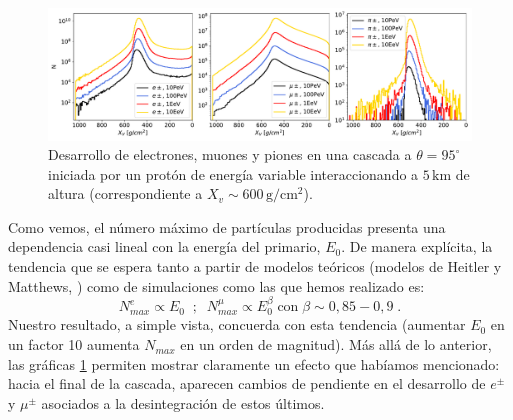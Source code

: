 \documentclass[11 pt, a4paper]{article} %
\numberwithin{equation}{section}
\numberwithin{figure}{section}
\numberwithin{table}{section}
\begin{document}
\begin{figure}[H]
	\centering
	\includegraphics[width=1\linewidth]{figures/cascadas/upgoing_p_varE_95deg_5km_v3}
	\caption{Desarrollo de electrones, muones y piones en una cascada a $\theta=95^\circ$ iniciada por un protón de energía variable interaccionando a $5\,\mathrm{km}$ de altura (correspondiente a $X_v\sim600\,\mathrm{g/cm^2}$).}
	\label{Carac_UG_varE}
\end{figure}
Como vemos, el número máximo de partículas producidas presenta una dependencia casi lineal con la energía del primario, $E_0$. De manera explícita, la tendencia que se espera tanto a partir de modelos teóricos (modelos de Heitler y Matthews, \cite{matthews2005heitler}) como de simulaciones como las que hemos realizado es:
\begin{equation}
	N_{max}^{e}\propto E_0\;\;;\;\;N_{max}^{\mu}\propto E_0^\beta\;\text{con}\;\beta\sim0,85-0,9\;.\label{ec25}
\end{equation}
Nuestro resultado, a simple vista, concuerda con esta tendencia (aumentar $E_0$ en un factor 10 aumenta $N_{max}$ en un orden de magnitud). Más allá de lo anterior, las gráficas \ref{Carac_UG_varE} permiten mostrar claramente un efecto que habíamos mencionado: hacia el final de la cascada, aparecen cambios de pendiente en el desarrollo de $e^\pm$ y $\mu^\pm$ asociados a la desintegración de estos últimos.
\end{document}
